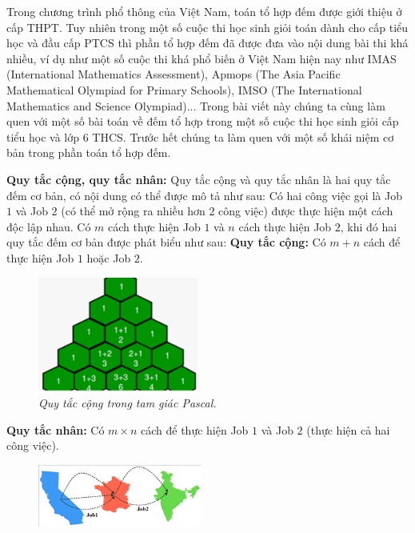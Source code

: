 \vspace*{80pt}
Trong chương trình phổ thông của Việt Nam, toán tổ hợp đếm được giới thiệu ở cấp THPT. Tuy nhiên trong một số cuộc thi học sinh giỏi toán dành cho cấp tiểu học và đầu cấp PTCS thì phần tổ hợp đếm đã được đưa vào nội dung bài thi khá nhiều, ví dụ như một số cuộc thi khá phổ biến ở Việt Nam hiện nay như IMAS (International Mathematics Assessment), Apmops (The Asia Pacific Mathematical Olympiad for Primary Schools), IMSO (The International Mathematics and Science Olympiad)...
\vskip 0.1cm
Trong bài viết này chúng ta cùng làm quen với một số bài toán về đếm tổ hợp trong một số cuộc thi học sinh giỏi cấp tiểu học và lớp $6$ THCS.
\vskip 0.1cm
Trước hết chúng ta làm quen với một số khái niệm cơ bản trong phần toán tổ hợp đếm.
\begin{multicols}{2}
	\textbf{\color{toancuabi}Quy tắc cộng, quy tắc nhân:} Quy tắc cộng và quy tắc nhân là hai quy tắc đếm cơ bản, có nội dung có thể được mô tả như sau:
	\vskip 0.1cm
	Có hai công việc gọi là Job $1$ và Job $2$ (có thể mở rộng ra nhiều hơn $2$ công việc) được thực hiện một cách độc lập nhau. Có $m$ cách thực hiện Job $1$ và $n$ cách thực hiện Job $2$, khi đó hai quy tắc đếm cơ bản được phát biểu như sau:
	\vskip 0.1cm
	\textbf{\color{toancuabi}Quy tắc cộng:} Có $m+n$ cách để thực hiện Job $1$ hoặc Job $2$.
	\begin{figure}[H]
		\centering
		\vspace*{-10pt}
		\captionsetup{labelformat=empty, justification=centering}
		\includegraphics[width=0.47\textwidth]{1}
		\caption{\small\textit{Quy tắc cộng trong tam giác Pascal.}}
		\vspace*{-5pt}
	\end{figure}
	\textbf{\color{toancuabi}Quy tắc nhân:} Có $m\times n$ cách để thực hiện Job $1$ và Job $2$ (thực hiện cả hai công việc).
	\begin{figure}[H]
		\centering
		\vspace*{5pt}
		\captionsetup{labelformat=empty, justification=centering}
		\includegraphics[width=0.48\textwidth]{2}

\end{figure}
\end{multicols}
